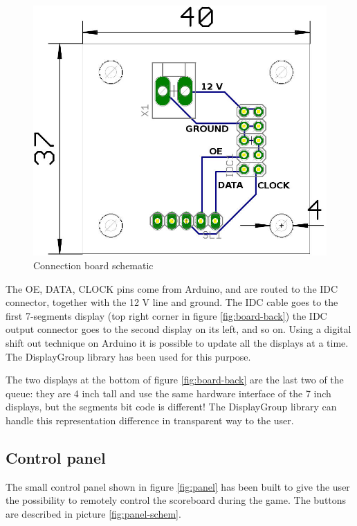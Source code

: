 \documentclass[11pt,english]{article}
\begin{document}
%
\begin{figure}[htb]
\centering\includegraphics[scale=0.30]{img/Board-schem}

\caption{Connection board schematic \label{fig:board-schem}}

\end{figure}

The OE, DATA, CLOCK pins come from Arduino, and are routed to the IDC connector, together with the 12 V line and 
ground. The IDC cable goes to the first 7-segments display (top right corner in figure \ref{fig:board-back})
the IDC output connector goes to the second display on its left, and so on. Using a digital shift out technique 
on Arduino it is possible to update all the displays at a time. The DisplayGroup library has been used for this 
purpose.

The two displays at the bottom of figure \ref{fig:board-back} are the last two of the queue: they are 4 inch tall 
and use the same hardware interface of the 7 inch displays, but the segments bit code is different!
The DisplayGroup library can handle this representation difference in transparent way to the user.


\subsection{Control panel}\label{subsec:contro-panel}

The small control panel shown in figure \ref{fig:panel} has been built to give the user the possibility 
to remotely control the scoreboard during the game. The buttons are described in picture \ref{fig:panel-schem}.
\end{document}
